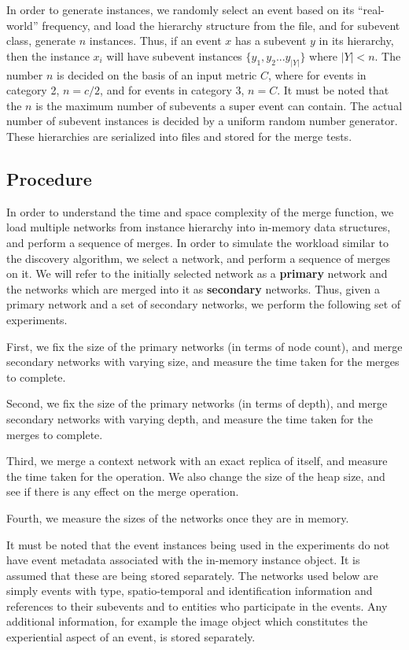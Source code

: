 In order to generate instances, we randomly select an event based on its ``real-world'' frequency, and load the hierarchy structure from the file, and for subevent class, generate $n$ instances. Thus, if an event $x$ has a subevent $y$ in its hierarchy, then the instance $x_i$ will have subevent instances $\{y_1, y_2 ... y_{|Y|}\}$ where $|Y| < n$. The number $n$ is decided on the basis of an input metric $C$, where for events in category 2, $n = c/2$, and for events in category 3, $n = C$. It must be noted that the $n$ is the maximum number of subevents a super event can contain. The actual number of subevent instances is decided by a uniform random number generator. These hierarchies are serialized into files and stored for the merge tests.

\subsection{Procedure}
In order to understand the time and space complexity of the merge function, we load multiple networks from instance hierarchy into in-memory data structures, and perform a sequence of merges. In order to simulate the workload similar to the discovery algorithm, we select a network, and perform a sequence of merges on it. We will refer to the initially selected network as a \textbf{primary} network and the networks which are merged into it as \textbf{secondary} networks. Thus, given a primary network and a set of secondary networks, we perform the following set of experiments.

First, we fix the size of the primary networks (in terms of node count), and merge secondary networks with varying size, and measure the time taken for the merges to complete.

Second, we fix the size of the primary networks (in terms of depth), and merge secondary networks with varying depth, and measure the time taken for the merges to complete.

Third, we merge a context network with an exact replica of itself, and measure the time taken for the operation. We also change the size of the heap size, and see if there is any effect on the merge operation.

Fourth, we measure the sizes of the networks once they are in memory.

It must be noted that the event instances being used in the experiments do not have event metadata associated with the in-memory instance object. It is assumed that these are being stored separately. The networks used below are simply events with type, spatio-temporal and identification information and references to their subevents and to entities who participate in the events. Any additional information, for example the image object which constitutes the experiential aspect of an event, is stored separately.

